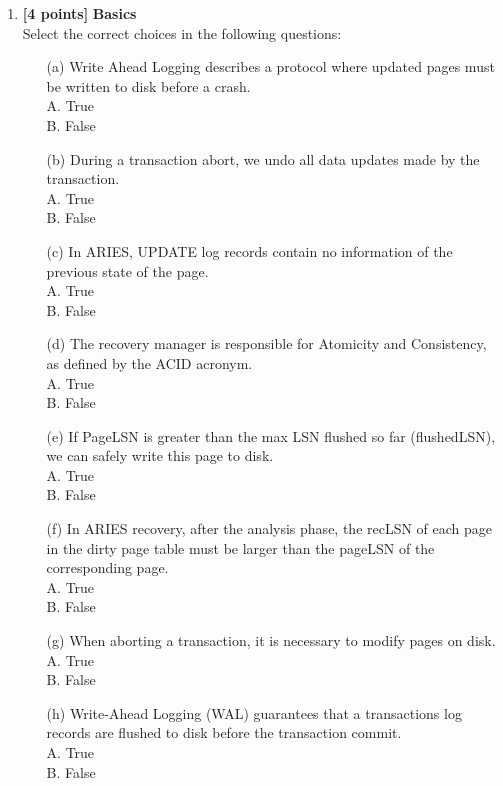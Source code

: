 \documentclass[10pt]{article}
\begin{document}
\begin{enumerate}
	\item \textbf{[4 points]} \textbf{Basics} \\
	      Select the correct choices in the following questions:
	      \begin{itemize}
		      \item[(a)] Write Ahead Logging describes a protocol where updated pages must be written to disk before a crash. \\
		            A. True \\
		            B. False \\
		      \item[(b)] During a transaction abort, we undo all data updates made by the transaction. \\
		            A. True \\
		            B. False \\
		      \item[(c)] In ARIES, UPDATE log records contain no information of the previous state of the page. \\
		            A. True \\
		            B. False \\
		      \item[(d)] The recovery manager is responsible for Atomicity and Consistency, as defined by the ACID acronym. \\
		            A. True \\
		            B. False \\
		      \item[(e)] If PageLSN is greater than the max LSN flushed so far (flushedLSN), we can safely write this page to disk. \\
		            A. True \\
		            B. False \\
		      \item[(f)] In ARIES recovery, after the analysis phase, the recLSN of each page in the dirty page table must be larger than the pageLSN of the corresponding page. \\
		            A. True \\
		            B. False \\
		      \item[(g)] When aborting a transaction, it is necessary to modify pages on disk. \\
		            A. True \\
		            B. False \\
		      \item[(h)] Write-Ahead Logging (WAL) guarantees that a transactions log records are flushed to disk before the transaction commit. \\
		            A. True \\
		            B. False \\
	      \end{itemize}
		  

\end{enumerate}
\end{document}
